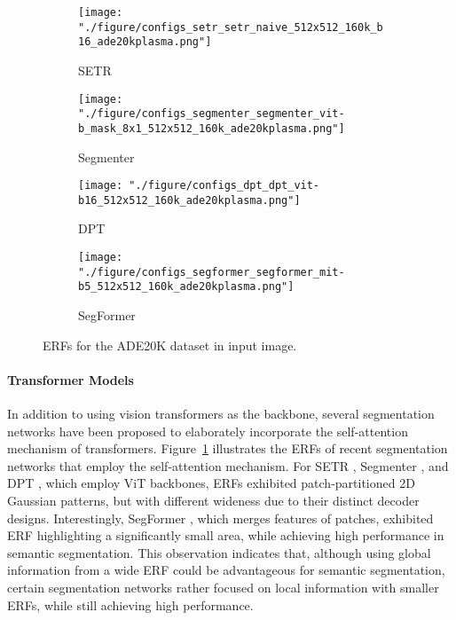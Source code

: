 \documentclass{article}
\def\figref#1{Figure~\ref{#1}}
\begin{document}
\begin{figure}[t!]
	\centering
	\begin{subfigure}[b]{0.241\linewidth}
		\centering
		\texttt{[image: "./figure/configs\_setr\_setr\_naive\_512x512\_160k\_b16\_ade20kplasma.png"]}
		\caption{SETR}
	\end{subfigure}
	\hfill
	\begin{subfigure}[b]{0.241\linewidth}
		\centering
		\texttt{[image: "./figure/configs\_segmenter\_segmenter\_vit-b\_mask\_8x1\_512x512\_160k\_ade20kplasma.png"]}
		\caption{Segmenter}
	\end{subfigure}
	\hfill
	\begin{subfigure}[b]{0.241\linewidth}
		\centering
		\texttt{[image: "./figure/configs\_dpt\_dpt\_vit-b16\_512x512\_160k\_ade20kplasma.png"]}
		\caption{DPT}
	\end{subfigure}
	\hfill
	\begin{subfigure}[b]{0.241\linewidth}
		\centering
		\texttt{[image: "./figure/configs\_segformer\_segformer\_mit-b5\_512x512\_160k\_ade20kplasma.png"]}
		\caption{SegFormer}
	\end{subfigure}
	\caption{ERFs for the ADE20K dataset in  input image.}
	\label{fig:trss}
\end{figure}

\paragraph{Transformer Models} In addition to using vision transformers as the backbone, several segmentation networks have been proposed to elaborately incorporate the self-attention mechanism of transformers. \figref{fig:trss} illustrates the ERFs of recent segmentation networks that employ the self-attention mechanism. For SETR \citep{DBLP:conf/cvpr/ZhengLZZLWFFXT021}, Segmenter \citep{DBLP:conf/iccv/StrudelPLS21}, and DPT \citep{DBLP:conf/iccv/RanftlBK21}, which employ ViT backbones, ERFs exhibited patch-partitioned 2D Gaussian patterns, but with different wideness due to their distinct decoder designs. Interestingly, SegFormer \citep{DBLP:conf/nips/XieWYAAL21}, which merges features of patches, exhibited ERF highlighting a significantly small area, while achieving high performance in semantic segmentation. This observation indicates that, although using global information from a wide ERF could be advantageous for semantic segmentation, certain segmentation networks rather focused on local information with smaller ERFs, while still achieving high performance.
\end{document}
